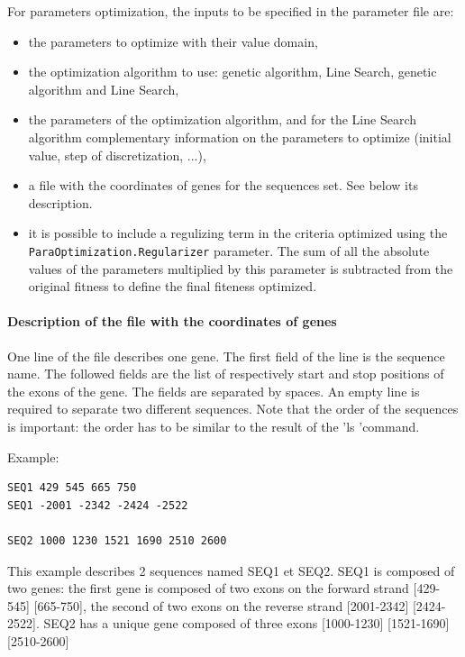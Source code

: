 \documentclass[a4paper,titlepage]{report}
\begin{document}
For parameters optimization, the inputs to be specified in the
parameter file are:
\begin{itemize}
\item the parameters to optimize with their value domain,
\item the optimization algorithm to use: genetic algorithm, Line
  Search, genetic algorithm and Line Search,
\item the parameters of the optimization algorithm, and for the Line
  Search algorithm complementary information on the parameters to
  optimize (initial value, step of discretization, ...),
\item a file with the coordinates of genes for the sequences set. See below its description.
\item it is possible to include a regulizing term in the criteria
optimized using the \texttt{ParaOptimization.Regularizer} parameter.
The sum of all the absolute values of the parameters multiplied by this parameter is subtracted from the original fitness to define the final fiteness optimized.\end{itemize}

\paragraph{Description of the file with the coordinates of genes}
One line of the file describes one gene. The first field of the line is the sequence name. The followed fields are the list of respectively start and stop positions of the exons of the gene. 
The fields are separated by spaces.
An empty line is required to separate two different sequences.
Note that the order of the sequences is important: the order has to be similar to the result of the 'ls 'command.

Example:
{\scriptsize \begin{verbatim}
SEQ1 429 545 665 750
SEQ1 -2001 -2342 -2424 -2522

SEQ2 1000 1230 1521 1690 2510 2600

\end{verbatim}}
This example describes 2 sequences named SEQ1 et SEQ2. SEQ1 is composed of two genes: the first gene is composed of two exons on the forward strand [429-545] [665-750], 
the second of two exons on the reverse strand [2001-2342] [2424-2522].
SEQ2 has a unique gene composed of three exons [1000-1230] [1521-1690] [2510-2600]
\end{document}
